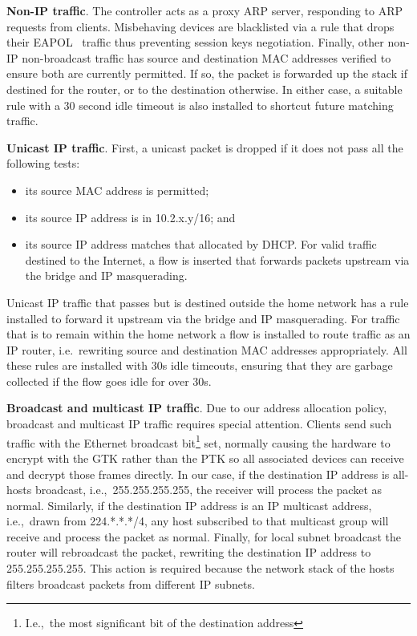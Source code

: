 \textbf{Non-IP traffic}.  The controller acts as a proxy ARP server, responding
to ARP requests from clients.  Misbehaving devices are blacklisted via a rule
that drops their EAPOL~\cite{rfc:3748} traffic thus preventing session keys
negotiation.
Finally, other non-IP non-broadcast traffic has source and destination MAC addresses verified
to ensure both are currently permitted.  If so, the packet is forwarded up the
stack if destined for the router, or to the destination otherwise.  In either
case, a suitable \of rule with a 30 second idle timeout is also installed to
shortcut future matching traffic.

\textbf{Unicast IP traffic}.  First, a unicast packet is dropped if it does not
pass all the following tests: 
\begin{itemize}
    \item its source MAC address is permitted; 
    \item its source IP address is in 10.2.x.y/16; and
    \item its source IP address matches that allocated by DHCP.  For valid
      traffic destined to the Internet, a flow is inserted that forwards packets
      upstream via the bridge and IP masquerading.  
\end{itemize} 
Unicast IP traffic that passes but is destined outside the home network has a
rule installed to forward it upstream via the bridge and IP masquerading.  For
traffic that is to remain within the home network a flow is installed to route
traffic as an IP router, i.e.~rewriting source and destination MAC addresses
appropriately.  All these rules are installed with 30s idle timeouts, ensuring
that they are garbage collected if the flow goes idle for over 30s.

\textbf{Broadcast and multicast IP traffic}.  Due to our address allocation
policy, broadcast and multicast IP traffic requires special attention.  Clients
send such traffic with the Ethernet broadcast bit\footnote{I.e.,~the most
  significant bit of the destination address} set, normally causing the hardware
to encrypt with the GTK rather than the PTK so all associated devices can
receive and decrypt those frames directly.  In our case, if the destination IP
address is all-hosts broadcast, i.e.,~255.255.255.255, the receiver will process
the packet as normal.  Similarly, if the destination IP address is an IP
multicast address, i.e.,~drawn from 224.*.*.*/4, any host subscribed to that
multicast group will receive and process the packet as normal. Finally, for
local subnet broadcast the router will rebroadcast the packet, rewriting the
destination IP address to 255.255.255.255. This action is required because the
network stack of the hosts filters broadcast packets from different IP subnets.

